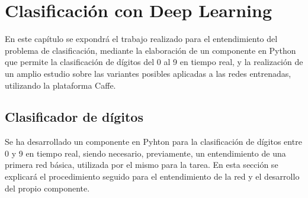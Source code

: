 \chapter{Clasificación con Deep Learning}\label{cap.clasificacion}
En este capítulo se expondrá el trabajo realizado para el entendimiento del problema de clasificación, mediante la elaboración de un componente en Python que permite la clasificación de dígitos del 0 al 9 en tiempo real, y la realización de un amplio estudio sobre las variantes posibles aplicadas a las redes entrenadas, utilizando la plataforma Caffe.\\
\section{Clasificador de dígitos}
Se ha desarrollado un componente en Pyhton para la clasificación de dígitos entre 0 y 9 en tiempo real, siendo necesario, previamente, un entendimiento de una primera red básica, utilizada por el mismo para la tarea. En esta sección se explicará el procedimiento seguido para el entendimiento de la red y el desarrollo del propio componente.\\

